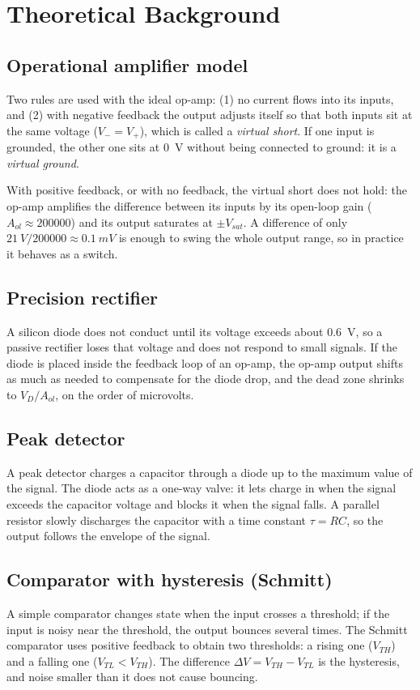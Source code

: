 \documentclass[11pt,letterpaper]{article}
\newcommand{\VTH}{V_{TH}}
\newcommand{\VTL}{V_{TL}}
\newcommand{\Vsat}{V_{sat}}
\begin{document}
\section{Theoretical Background}

\subsection{Operational amplifier model}
Two rules are used with the ideal op-amp: (1) no current flows into its inputs, and (2) with negative feedback the output adjusts itself so that both inputs sit at the same voltage ($V_- = V_+$), which is called a \emph{virtual short}. If one input is grounded, the other one sits at \SI{0}{V} without being connected to ground: it is a \emph{virtual ground}.

With positive feedback, or with no feedback, the virtual short does not hold: the op-amp amplifies the difference between its inputs by its open-loop gain ($A_{ol}\approx\num{200000}$) and its output saturates at $\pm\Vsat$. A difference of only $\SI{21}{V}/\num{200000}\approx\SI{0.1}{mV}$ is enough to swing the whole output range, so in practice it behaves as a switch.

\subsection{Precision rectifier}
A silicon diode does not conduct until its voltage exceeds about \SI{0.6}{V}, so a passive rectifier loses that voltage and does not respond to small signals. If the diode is placed inside the feedback loop of an op-amp, the op-amp output shifts as much as needed to compensate for the diode drop, and the dead zone shrinks to $V_D/A_{ol}$, on the order of microvolts.

\subsection{Peak detector}
A peak detector charges a capacitor through a diode up to the maximum value of the signal. The diode acts as a one-way valve: it lets charge in when the signal exceeds the capacitor voltage and blocks it when the signal falls. A parallel resistor slowly discharges the capacitor with a time constant $\tau=RC$, so the output follows the envelope of the signal.

\subsection{Comparator with hysteresis (Schmitt)}
A simple comparator changes state when the input crosses a threshold; if the input is noisy near the threshold, the output bounces several times. The Schmitt comparator uses positive feedback to obtain two thresholds: a rising one ($\VTH$) and a falling one ($\VTL<\VTH$). The difference $\Delta V=\VTH-\VTL$ is the hysteresis, and noise smaller than it does not cause bouncing.
\end{document}
